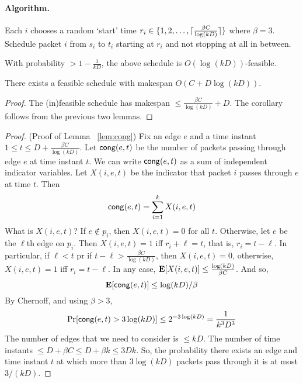 \documentclass[11pt]{article}
\begin{document}
	\paragraph{Algorithm.} Each $i$ chooses a random `start' time $r_i \in \{1,2,\ldots, \lceil\frac{\beta C}{\log(kD)}\rceil\}$ where $\beta = 3$. Schedule packet $i$ from $s_i$ to $t_i$ starting at 
	$r_i$ and not stopping at all in between. 
	
	\begin{lemma}\label{lem:cong}
		With probability $> 1-\frac{1}{kD}$, the above schedule is $O\left(\log(kD)\right)$-feasible.
	\end{lemma}
	\begin{corollary}
		There exists a feasible schedule with makespan $O(C + D\log(kD))$.
	\end{corollary}
	\begin{proof}
		The (in)feasible schedule has makespan $\leq \frac{\beta C}{\log(kD)} + D$. The corollary follows from the previous two lemmas.
	\end{proof}
	\begin{proof}{(Proof of Lemma ~\ref{lem:cong})}
		Fix an edge $e$ and a time instant $1 \leq t \leq D + \frac{\beta C}{\log(kD)}$.
		\def\cong{{\sf cong}}
		Let $\cong(e,t)$ be the number of packets passing through edge $e$ at time instant $t$. We can write $\cong(e,t)$ as a sum of independent indicator variables.
		Let $X(i,e,t)$ be the indicator that packet $i$ passes through $e$ at time $t$. Then
		\[
		\cong(e,t) = \sum_{i=1}^k X(i,e,t)
		\]
		What is $X(i,e,t)$? If $e\notin p_i$, then $X(i,e,t) = 0$ for all $t$. Otherwise, let $e$ be the $\ell$th edge on $p_i$. Then $X(i,e,t) = 1$ iff $r_i + \ell = t$, that is, $r_i = t - \ell$.
		In particular, if $\ell < t$ pr if $t - \ell > \frac{\beta C}{\log(kD)}$, then $X(i,e,t) = 0$, otherwise, $X(i,e,t) = 1$ iff $r_i = t - \ell$. In any case, $\hbox{\bf E}[X(i,e,t)] \leq \frac{\log(kD)}{\beta C}$.
		And so,
		\[
		\Exp[\cong(e,t)] \leq \log(kD)/\beta
		\]
		By Chernoff, and using $\beta>3$,
		\[
		\Pr[\cong(e,t) > 3\log(kD)] \leq 2^{-3\log(kD)} = \frac{1}{k^3D^3}
		\]
		The number of edges that we need to consider is $\leq kD$. The number of time instants $\leq D + \beta C \leq D+\beta k \leq 3Dk$.
		So, the probability there exists an edge and time instant $t$ at which more than $3\log(kD)$ packets pass through it is at most $3/(kD)$.
	\end{proof}
\end{document}
